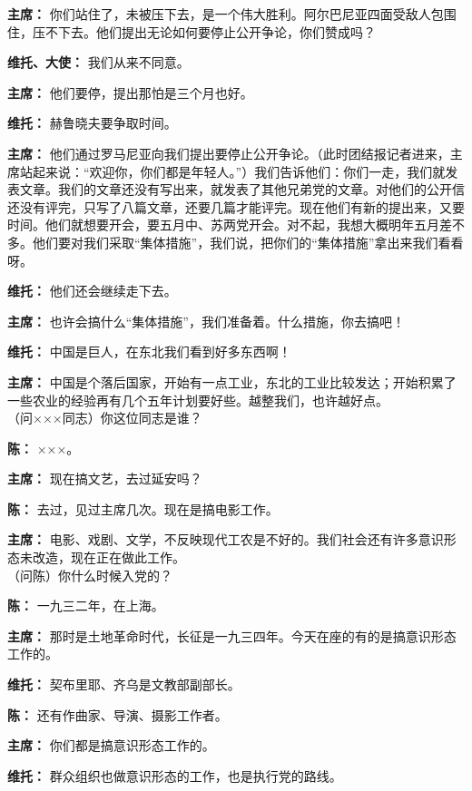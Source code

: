 \begin{list}{}
\item[\textbf{主席：}]{你们站住了，未被压下去，是一个伟大胜利。阿尔巴尼亚四面受敌人包围住，压不下去。他们提出无论如何要停止公开争论，你们赞成吗？}
\item[\textbf{维托、大使：}]{我们从来不同意。}
\item[\textbf{主席：}]{他们要停，提出那怕是三个月也好。}
\item[\textbf{维托：}]{赫鲁晓夫要争取时间。}
\item[\textbf{主席：}]{他们通过罗马尼亚向我们提出要停止公开争论。（此时团结报记者进来，主席站起来说：“欢迎你，你们都是年轻人。”）我们告诉他们：你们一走，我们就发表文章。我们的文章还没有写出来，就发表了其他兄弟党的文章。对他们的公开信还没有评完，只写了八篇文章，还要几篇才能评完。现在他们有新的提出来，又要时间。他们就想要开会，要五月中、苏两党开会。对不起，我想大概明年五月差不多。他们要对我们采取“集体措施”，我们说，把你们的“集体措施”拿出来我们看看呀。}
\item[\textbf{维托：}]{他们还会继续走下去。}
\item[\textbf{主席：}]{也许会搞什么“集体措施”，我们准备着。什么措施，你去搞吧！}
\item[\textbf{维托：}]{中国是巨人，在东北我们看到好多东西啊！}
\item[\textbf{主席：}]{中国是个落后国家，开始有一点工业，东北的工业比较发达；开始积累了一些农业的经验再有几个五年计划要好些。越整我们，也许越好点。\\（问×××同志）你这位同志是谁？
}
\item[\textbf{陈：}]{×××。}
\item[\textbf{主席：}]{现在搞文艺，去过延安吗？}
\item[\textbf{陈：}]{去过，见过主席几次。现在是搞电影工作。}
\item[\textbf{主席：}]{电影、戏剧、文学，不反映现代工农是不好的。我们社会还有许多意识形态未改造，现在正在做此工作。\\（问陈）你什么时候入党的？}
\item[\textbf{陈：}]{一九三二年，在上海。}
\item[\textbf{主席：}]{那时是土地革命时代，长征是一九三四年。今天在座的有的是搞意识形态工作的。}
\item[\textbf{维托：}]{契布里耶、齐乌是文教部副部长。}
\item[\textbf{陈：}]{还有作曲家、导演、摄影工作者。}
\item[\textbf{主席：}]{你们都是搞意识形态工作的。}
\item[\textbf{维托：}]{群众组织也做意识形态的工作，也是执行党的路线。}

\end{list}
